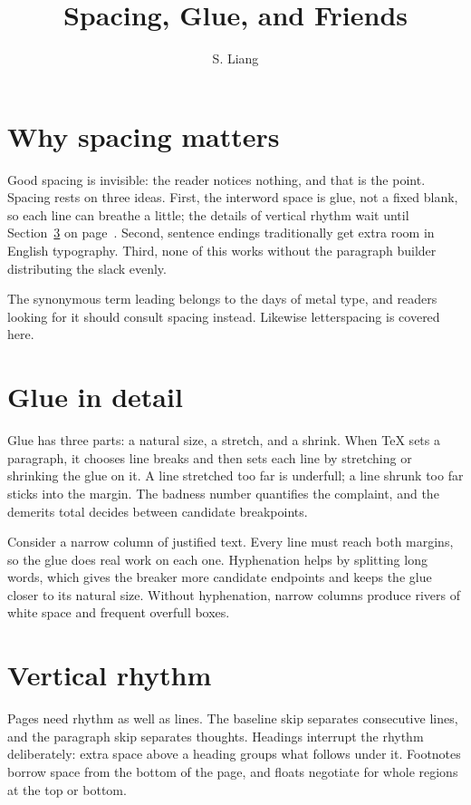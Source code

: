 \documentclass[11pt]{article}
\title{Spacing, Glue, and Friends}
\author{S. Liang}
\date{}
\begin{document}
\maketitle

\section{Why spacing matters}
\label{sec:why}

Good spacing is invisible: the reader notices nothing, and
that is the point. Spacing rests on three ideas. First, the
interword space is glue, not a fixed blank, so each
line can breathe a little; the details of vertical rhythm wait until
Section~\ref{sec:rhythm} on page~\pageref{sec:rhythm}. Second,
sentence endings
traditionally get extra room in English typography. Third, none of this works
without the paragraph builder distributing the slack evenly.

The synonymous term leading belongs to the days
of metal type, and readers looking for it should consult spacing instead.
Likewise letterspacing is covered here.

\section{Glue in detail}

Glue has three parts: a natural size, a stretch, and a shrink. When \TeX{}
sets a paragraph, it chooses line breaks and then sets each line by
stretching or shrinking the glue on it. A line stretched too far is
underfull; a line shrunk too far sticks into the margin. The badness number
quantifies the complaint, and the demerits total decides between candidate
breakpoints.

Consider a narrow column of justified text. Every line must reach both
margins, so the glue does real work on each one. Hyphenation helps by
splitting long words, which gives the breaker more candidate endpoints and
keeps the glue closer to its natural size. Without hyphenation, narrow
columns produce rivers of white space and frequent overfull boxes.

\section{Vertical rhythm}
\label{sec:rhythm}

Pages need rhythm as well as lines. The baseline skip separates consecutive
lines, and the paragraph skip separates thoughts. Headings interrupt the
rhythm deliberately: extra space above a heading groups what follows under
it. Footnotes borrow space from the bottom of the page, and floats negotiate
for whole regions at the top or bottom.
\end{document}
